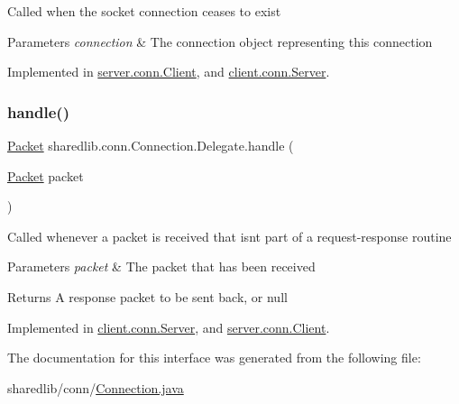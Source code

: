 Called when the socket connection ceases to exist


\begin{DoxyParams}{Parameters}
{\em connection} & The connection object representing this connection \\
\hline
\end{DoxyParams}


Implemented in \hyperlink{classserver_1_1conn_1_1_client_aa31a10ee47f357ef36983e456c5e9f8e}{server.\+conn.\+Client}, and \hyperlink{classclient_1_1conn_1_1_server_ae2a0ab226b1622da8e19137fb89bdc81}{client.\+conn.\+Server}.

\hypertarget{interfacesharedlib_1_1conn_1_1_connection_1_1_delegate_abb4308f0b1aa890e0c19635f1eb9cd09}{}\label{interfacesharedlib_1_1conn_1_1_connection_1_1_delegate_abb4308f0b1aa890e0c19635f1eb9cd09} 
\subsubsection{\texorpdfstring{handle()}{handle()}}
{\footnotesize\ttfamily \hyperlink{classsharedlib_1_1conn_1_1_packet}{Packet} sharedlib.\+conn.\+Connection.\+Delegate.\+handle (\begin{DoxyParamCaption}\item[{\hyperlink{classsharedlib_1_1conn_1_1_packet}{Packet}}]{packet }\end{DoxyParamCaption})}

Called whenever a packet is received that isn\textquotesingle{}t part of a request-\/response routine


\begin{DoxyParams}{Parameters}
{\em packet} & The packet that has been received \\
\hline
\end{DoxyParams}
\begin{DoxyReturn}{Returns}
A response packet to be sent back, or null 
\end{DoxyReturn}


Implemented in \hyperlink{classclient_1_1conn_1_1_server_a620def50e5115d3798407dfff5433ead}{client.\+conn.\+Server}, and \hyperlink{classserver_1_1conn_1_1_client_a0ddbd06c67e01c0064b5640d5e82c810}{server.\+conn.\+Client}.



The documentation for this interface was generated from the following file\+:\begin{DoxyCompactItemize}
\item 
sharedlib/conn/\hyperlink{_connection_8java}{Connection.\+java}\end{DoxyCompactItemize}

